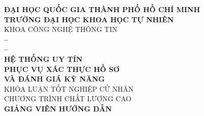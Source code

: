 
\begin{titlepage}
  \begin{center}
    {\large \textbf{ĐẠI HỌC QUỐC GIA THÀNH PHỐ HỒ CHÍ MINH}} \\
    \smallskip
    {\large \textbf{TRƯỜNG ĐẠI HỌC KHOA HỌC TỰ NHIÊN}} \\
    \medskip
    KHOA CÔNG NGHỆ THÔNG TIN \\[1.8cm]

    {\Large \bfseries \studentonename{} -- \studentoneid} \\
    {\Large \bfseries \studenttwoname{} -- \studenttwoid} \\[1.8cm]

    {\huge \bfseries HỆ THỐNG UY TÍN \\ PHỤC VỤ XÁC THỰC HỒ SƠ \\[3mm] VÀ ĐÁNH GIÁ KỸ NĂNG} \\[2.1cm]

    {\large KHÓA LUẬN TỐT NGHIỆP CỬ NHÂN} \\
    {\large CHƯƠNG TRÌNH CHẤT LƯỢNG CAO} \\[2.1cm]

    {\Large \textbf{GIẢNG VIÊN HƯỚNG DẪN}} \\
    \medskip
    {\large \advisorfulltitle} \\

    \vfill
  \end{center}
\end{titlepage}

\restoregeometry